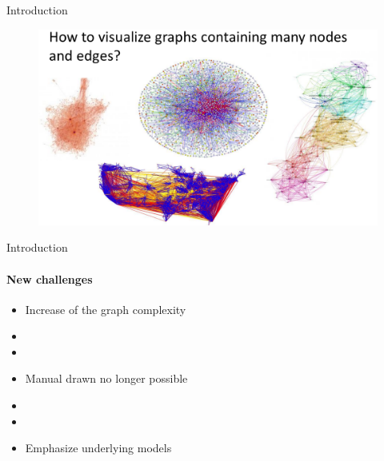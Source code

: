 \begin{frame}{Introduction}
\begin{center}
\end{center}
\begin {figure}[H]
  \centering
  \includegraphics[scale=0.25]{../rapport/img/graphes_moches.png}
\end {figure}
\end{frame}

\begin{frame}{Introduction}
\framesubtitle{New challenges}
\begin{block}{}
\begin{center}
\begin{itemize}
\item Increase of the graph complexity
\item[]
\item[]
\item Manual drawn no longer possible
\item[]
\item[]
\item Emphasize underlying models
\end{itemize}
\end{center}
\end{block}
\end{frame}
